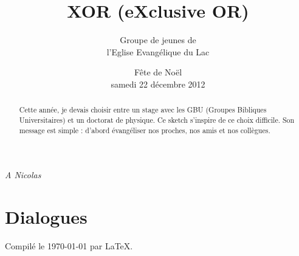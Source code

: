 \documentclass[12pt]{article}
\title{XOR (eXclusive OR)}
\author{Groupe de jeunes de \\ l'Eglise Evangélique du Lac}
\date{Fête de Noël \\ samedi 22 décembre 2012}
\begin{document}
\maketitle

\newpage

\begin{center}
\textit{A Nicolas}
\end{center}

\vfill

\begin{abstract}
Cette année, je devais choisir entre un stage avec les GBU
(Groupes Bibliques Universitaires) et un doctorat de physique.
Ce sketch s'inspire de ce choix difficile.
Son message est simple : d'abord évangéliser nos proches,
nos amis et nos collègues.
\end{abstract}

\setcounter{tocdepth}{2}
\tableofcontents

\vfill

\newpage



\newpage

\section{Dialogues}

	
	
	
	
\newpage
	


\vfill

\begin{center}
Compilé le \today{} par \LaTeX{}.
\end{center}
\end{document}
